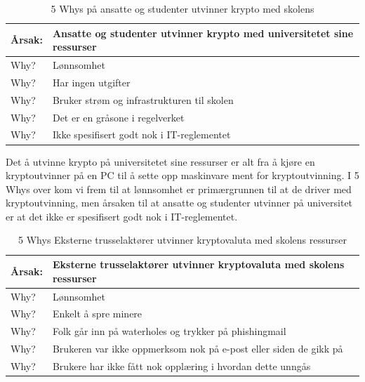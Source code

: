 \begin{table} [H]
    \centering
    \begin{tabular}{ | m{5em} | m{30em} | }
        \hline
            \cellcolor{yellow} Årsak: & \cellcolor{yellow} Ansatte og studenter utvinner krypto med universitetet sine ressurser                \\
        \hline
            Why? & Lønnsomhet                                    \\
        \hline
            Why? & Har ingen utgifter                                            \\
        \hline
            Why? & Bruker strøm og infrastrukturen til skolen                \\
        \hline
            Why? & Det er en gråsone i regelverket           \\
        \hline
            Why? & Ikke spesifisert godt nok i IT-reglementet   \\
        \hline
    \end{tabular}
    \caption[5 Whys: Ansatte og studenter utvinner krypto med skolens]{5 Whys på ansatte og studenter utvinner krypto med skolens}
    \label{5Whys-interne}
\end{table}
Det å utvinne krypto på universitetet sine ressurser er alt fra å kjøre en kryptoutvinner på en PC til å sette opp maskinvare ment for kryptoutvinning. I 5 Whys over kom vi frem til at lønnsomhet er primærgrunnen til at de driver med kryptoutvinning, men årsaken til at ansatte og studenter utvinner på universitet er at det ikke er spesifisert godt nok i IT-reglementet.   


\begin{table} [H]
    \centering
    \begin{tabular}{ | m{5em} | m{30em} | }
        \hline
            \cellcolor{yellow} Årsak: & \cellcolor{yellow} Eksterne trusselaktører utvinner kryptovaluta med skolens ressurser              \\
        \hline
            Why? & Lønnsomhet                                   \\
        \hline
            Why? & Enkelt å spre minere                                           \\
        \hline
            Why? & Folk går inn på waterholes og trykker på phishingmail               \\
        \hline
            Why? & Brukeren var ikke oppmerksom nok på e-post eller siden de gikk på           \\
        \hline
            Why? & Brukere har ikke fått nok opplæring i hvordan dette unngås    \\
        \hline
    \end{tabular}
    \caption[5 Whys: Eksterne trusselaktører utvinner kryptovaluta med skolens ressurser]{5 Whys Eksterne trusselaktører utvinner kryptovaluta med skolens ressurser}
    \label{5Whys-eksterne}
\end{table}

